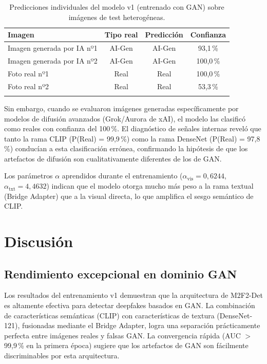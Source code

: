 \documentclass[pdflatex,sn-mathphys-num]{sn-jnl}
\begin{document}
\begin{table}[h]
\caption{Predicciones individuales del modelo v1 (entrenado con GAN) sobre imágenes de test heterogéneas.}\label{tab:individual_tests}
\begin{tabular*}{\textwidth}{@{\extracolsep\fill}lccc}
\toprule
Imagen & Tipo real & Predicción & Confianza \\
\midrule
Imagen generada por IA nº1 & AI-Gen & AI-Gen & 93,1\,\% \\
Imagen generada por IA nº2 & AI-Gen & AI-Gen & 100,0\,\% \\
Foto real nº1 & Real & Real & 100,0\,\% \\
Foto real nº2 & Real & Real & 53,3\,\% \\
\botrule
\end{tabular*}
\end{table}

Sin embargo, cuando se evaluaron imágenes generadas específicamente por modelos de difusión avanzados (Grok/Aurora de xAI), el modelo las clasificó como reales con confianza del 100\,\%. El diagnóstico de señales internas reveló que tanto la rama CLIP (P(Real) = 99,9\,\%) como la rama DenseNet (P(Real) = 97,8\,\%) conducían a esta clasificación errónea, confirmando la hipótesis de que los artefactos de difusión son cualitativamente diferentes de los de GAN.

Los parámetros $\alpha$ aprendidos durante el entrenamiento ($\alpha_{\text{vis}} = 0,6244$, $\alpha_{\text{txt}} = 4,4632$) indican que el modelo otorga mucho más peso a la rama textual (Bridge Adapter) que a la visual directa, lo que amplifica el sesgo semántico de CLIP.


\section{Discusión}\label{sec:discussion}

\subsection{Rendimiento excepcional en dominio GAN}

Los resultados del entrenamiento v1 demuestran que la arquitectura de M2F2-Det es altamente efectiva para detectar deepfakes basados en GAN. La combinación de características semánticas (CLIP) con características de textura (DenseNet-121), fusionadas mediante el Bridge Adapter, logra una separación prácticamente perfecta entre imágenes reales y falsas GAN. La convergencia rápida (AUC $>$ 99,9\,\% en la primera época) sugiere que los artefactos de GAN son fácilmente discriminables por esta arquitectura.
\end{document}
